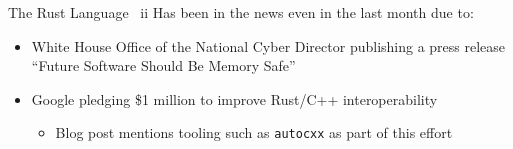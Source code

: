 \documentclass[10pt,aspectratio=169]{beamer}
\begin{document}
\begin{frame}{The Rust Language \ ii}
    Has been in the news even in the last month due to:
    \begin{itemize}
        \item White House Office of the National Cyber Director publishing a press release ``Future Software Should Be Memory Safe'' \cite{PressReleaseFuture2024}  %
        \item Google pledging \$1 million to improve Rust/C++ interoperability \cite{ImprovingInteroperabilityRust}  %
        \begin{itemize}
            \item<2-> \alert{Blog post mentions tooling such as \texttt{autocxx} as part of this effort}
        \end{itemize}
    \end{itemize}

    \vspace{0.5cm}
\end{frame}
\end{document}

